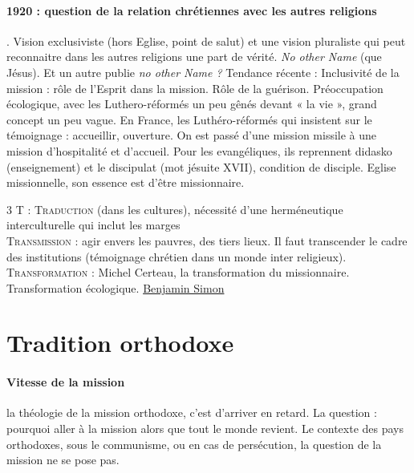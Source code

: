 \paragraph{1920 : question de la relation chrétiennes avec les autres religions}. Vision exclusiviste (hors Eglise, point de salut) et une vision pluraliste qui peut reconnaitre dans les autres religions une part de vérité.  \textit{No other Name} (que Jésus). Et un autre publie \textit{no other Name ?}
Tendance récente : Inclusivité de la mission : rôle de l’Esprit dans la mission. Rôle de la guérison. Préoccupation écologique, avec les Luthero-réformés un peu gênés devant « la vie », grand concept un peu vague.
En France, les Luthéro-réformés qui insistent sur le témoignage : accueillir, ouverture. On est passé d’une mission missile à une mission d’hospitalité et d’accueil. Pour les evangéliques, ils reprennent didasko (enseignement) et le discipulat (mot jésuite XVII), condition de disciple. Eglise missionnelle, son essence est d’être missionnaire. 
\begin{Synthesis}
3 T : \textsc{Traduction} (dans les cultures), nécessité d’une herméneutique interculturelle qui inclut les marges \\
\textsc{Transmission} : agir envers les pauvres, des tiers lieux. Il faut transcender le cadre des institutions (témoignage chrétien dans un monde inter religieux). \\
\textsc{Transformation} : Michel Certeau, la transformation du missionnaire. Transformation écologique. \href{https://acteurs.epudf.org/wp-content/uploads/sites/2/2021/02/textes-complementaires-vidal_evolution_de_la_figure_du_missionnaire-11477.pdf}{Benjamin Simon}
\end{Synthesis}


\section{Tradition orthodoxe}

\paragraph{Vitesse de la mission} la théologie de la mission orthodoxe, c’est d’arriver en retard. La question : pourquoi aller à la mission alors que tout le monde revient. Le contexte des pays orthodoxes, sous le communisme, ou en cas de persécution, la question de la mission ne se pose pas.
